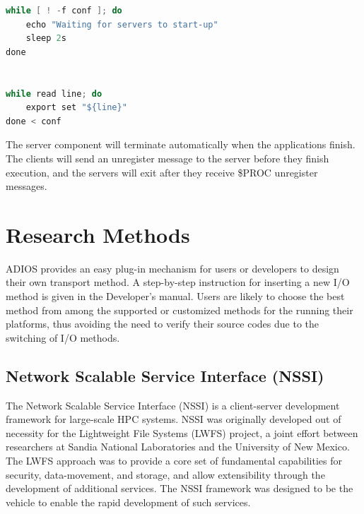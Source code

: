 \begin{lstlisting}[language=C, caption=Wait for server start-up completion and export the configuration to environment variables.]
while [ ! -f conf ]; do
	echo "Waiting for servers to start-up"
	sleep 2s
done


while read line; do
	export set "${line}"
done < conf
\end{lstlisting}

The server component will terminate automatically when the applications finish. 
The clients  will send an unregister message to the server before 
they finish execution, and the servers will exit after they receive \$PROC unregister 
messages.



\section{Research Methods}

ADIOS provides an easy plug-in mechanism for users or developers to design their 
own transport method. A step-by-step instruction for inserting a new I/O method 
is given in the Developer's manual. Users are likely to choose the best method from among 
the supported or customized methods for the running their platforms, thus avoiding 
the need to verify their source codes due to the switching of I/O methods.


\subsection{Network Scalable Service Interface (NSSI)}

The Network Scalable Service Interface (NSSI) is a client-server development framework 
for large-scale HPC systems.  NSSI was originally developed out of necessity for 
the Lightweight File Systems (LWFS) project, a joint effort between researchers 
at Sandia National Laboratories and the University of New Mexico.  The LWFS approach 
was to provide a core set of fundamental capabilities for security, data-movement, 
and storage, and allow extensibility through the development of additional services. 
 The NSSI framework was designed to be the vehicle to enable the rapid development 
of such services.

